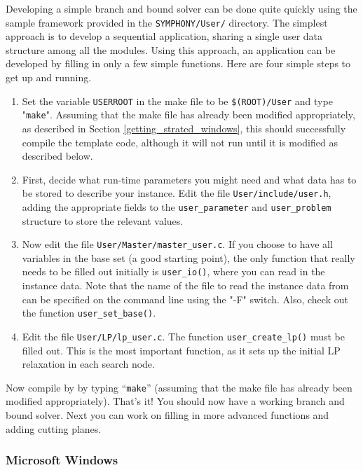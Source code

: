 Developing a simple branch and bound solver can be done quite quickly using
the sample framework provided in the \texttt{SYMPHONY/User/} directory. The
simplest approach is to develop a sequential application, sharing a single
user data structure among all the modules. Using this approach, an application
can be developed by filling in only a few simple functions. Here are four
simple steps to get up and running.
\begin{enumerate}

\item Set the variable \texttt{USERROOT} in the make file to be
\texttt{\$(ROOT)/User} and type "\texttt{make}". Assuming that the make file 
has already been modified appropriately, as described in Section
\ref{getting_strated_windows}, this should successfully compile the template
code, although it will not run until it is modified as described below.

\item First, decide what run-time parameters you might need and what data has 
to be stored to describe your instance. Edit the file
\texttt{User/include/user.h}, adding the appropriate fields to the
\texttt{user\_parameter} and \texttt{user\_problem} structure to store the
relevant values. 

\item Now edit the file \texttt{User/Master/master\_user.c}. If you choose to
have all variables in the base set (a good starting point), the only function
that really needs to be filled out initially is \texttt{user\_io()}, where you
can read in the instance data. Note that the name of the file to read the
instance data from can be specified on the command line using the "-F" switch.
Also, check out the function
\texttt{user\_set\_base()}.

\item Edit the file \texttt{User/LP/lp\_user.c}. The function
\texttt{user\_create\_lp()} must be filled out. This is the most important
function, as it sets up the initial LP relaxation in each search node.
\end{enumerate}

Now compile by by typing ``\texttt{make}'' (assuming that the make
file has already been modified appropriately). That's it! You should now have
a working branch and bound solver. Next you can work on filling in more
advanced functions and adding cutting planes.

\subsubsection{Microsoft Windows}

